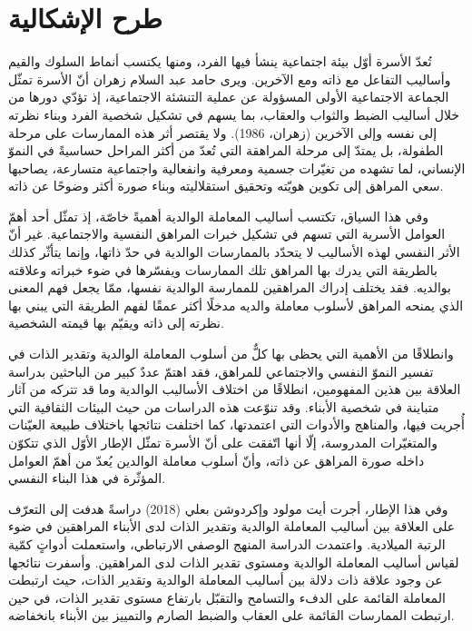 \section{طرح الإشكالية}
تُعدّ الأسرة أوّل بيئة اجتماعية ينشأ فيها الفرد، ومنها يكتسب أنماط السلوك والقيم وأساليب التفاعل
مع ذاته ومع الآخرين. ويرى حامد عبد السلام زهران أنّ الأسرة تمثّل الجماعة الاجتماعية الأولى المسؤولة
عن عملية التنشئة الاجتماعية، إذ تؤدّي دورها من خلال أساليب الضبط والثواب والعقاب، بما يسهم في
تشكيل شخصية الفرد وبناء نظرته إلى نفسه وإلى الآخرين (زهران، 1986). ولا يقتصر أثر هذه
الممارسات على مرحلة الطفولة، بل يمتدّ إلى مرحلة المراهقة التي تُعدّ من أكثر المراحل حساسيةً في النموّ
الإنساني، لما تشهده من تغيّرات جسمية ومعرفية وانفعالية واجتماعية متسارعة، يصاحبها سعي المراهق إلى
تكوين هويّته وتحقيق استقلاليته وبناء صورة أكثر وضوحًا عن ذاته.

وفي هذا السياق، تكتسب أساليب المعاملة الوالدية أهميةً خاصّة، إذ تمثّل أحد أهمّ العوامل الأسرية التي
تسهم في تشكيل خبرات المراهق النفسية والاجتماعية. غير أنّ الأثر النفسي لهذه الأساليب لا يتحدّد
بالممارسات الوالدية في حدّ ذاتها، وإنما يتأثّر كذلك بالطريقة التي يدرك بها المراهق تلك الممارسات
ويفسّرها في ضوء خبراته وعلاقته بوالديه. فقد يختلف إدراك المراهقين للممارسة الوالدية نفسها، ممّا يجعل
فهم المعنى الذي يمنحه المراهق لأسلوب معاملة والديه مدخلًا أكثر عمقًا لفهم الطريقة التي يبني بها نظرته
إلى ذاته ويقيّم بها قيمته الشخصية.

وانطلاقًا من الأهمية التي يحظى بها كلٌّ من أسلوب المعاملة الوالدية وتقدير الذات في تفسير النموّ النفسي
والاجتماعي للمراهق، فقد اهتمّ عددٌ كبير من الباحثين بدراسة العلاقة بين هذين المفهومين، انطلاقًا من
اختلاف الأساليب الوالدية وما قد تتركه من آثار متباينة في شخصية الأبناء. وقد تنوّعت هذه الدراسات من
حيث البيئات الثقافية التي أُجريت فيها، والمناهج والأدوات التي اعتمدتها، كما اختلفت نتائجها باختلاف
طبيعة العيّنات والمتغيّرات المدروسة، إلّا أنها اتّفقت على أنّ الأسرة تمثّل الإطار الأوّل الذي تتكوّن داخله
صورة المراهق عن ذاته، وأنّ أسلوب معاملة الوالدين يُعدّ من أهمّ العوامل المؤثّرة في هذا البناء النفسي.

وفي هذا الإطار، أجرت أيت مولود وإكردوشن بعلي (2018) دراسةً هدفت إلى التعرّف على العلاقة بين
أساليب المعاملة الوالدية وتقدير الذات لدى الأبناء المراهقين في ضوء الرتبة الميلادية. واعتمدت الدراسة
المنهج الوصفي الارتباطي، واستعملت أدواتٍ كمّية لقياس أساليب المعاملة الوالدية ومستوى تقدير الذات لدى
المراهقين. وأسفرت نتائجها عن وجود علاقة ذات دلالة بين أساليب المعاملة الوالدية وتقدير الذات، حيث
ارتبطت المعاملة القائمة على الدفء والتسامح والتقبّل بارتفاع مستوى تقدير الذات، في حين ارتبطت
الممارسات القائمة على العقاب والضبط الصارم والتمييز بين الأبناء بانخفاضه.

